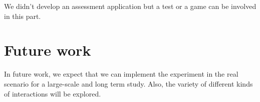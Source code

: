 \documentclass[12pt]{article}
\begin{document}
We didn't develop an assessment application but a test or a game can be involved in this part.
 
\newpage
\section{Future work}

In future work, we expect that we can implement the experiment in the real scenario for a large-scale and long term study. Also, the variety of different kinds of interactions will be explored.
 
\newpage


 
\end{document}
